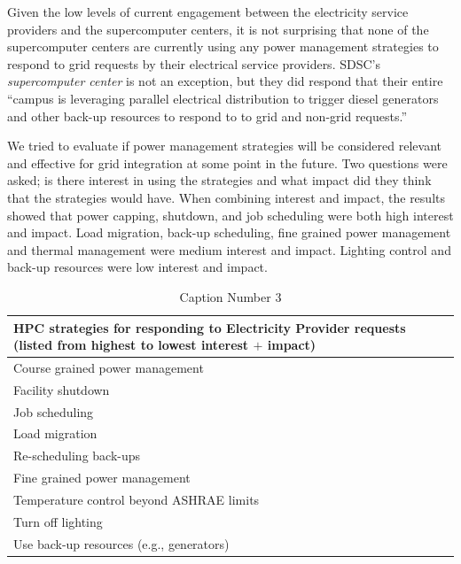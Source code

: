 \documentclass{llncs}
\begin{document}
Given the low levels of current engagement between the electricity service
providers and the supercomputer centers, it is not surprising that none of
the supercomputer centers are currently using any power management
strategies to respond to grid requests by their electrical service
providers. SDSC's \textit{supercomputer center} is not an exception, but they did respond that their
entire ``campus is leveraging parallel electrical distribution to trigger
diesel generators and other back-up resources to respond to to grid and
non-grid requests.''

We tried to evaluate if power management strategies will be considered
relevant and effective for grid integration at some point in the future. Two
questions were asked; is there interest in using the strategies and what
impact did they think that the strategies would have. When combining
interest and impact, the results showed that power capping, shutdown, and
job scheduling were both high interest and impact. Load migration, back-up
scheduling, fine grained power management and thermal management were medium
interest and impact. Lighting control and back-up resources were low
interest and impact.


\begin{table}[htbp]

\begin{center}
\caption{Caption Number 3}
\begin{tabular}{|p{299pt}|}
\hline
\textbf{HPC strategies for responding to Electricity Provider requests (listed from highest to lowest interest }$+$\textbf{ impact)} \\
\hline
Course grained power management \\
\hline
Facility shutdown \\
\hline
Job scheduling \\
\hline
Load migration \\
\hline
Re-scheduling back-ups \\
\hline
Fine grained power management \\
\hline
Temperature control beyond ASHRAE limits \\
\hline
Turn off lighting \\
\hline
Use back-up resources (e.g., generators) \\
\hline
\end{tabular}
\label{tab3}
\end{center}
\end{table}
\end{document}
